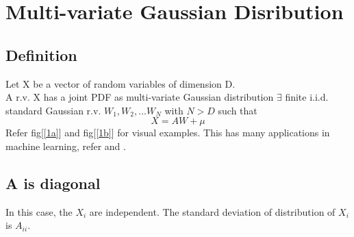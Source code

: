 \documentclass{article}
\begin{document}
\section{Multi-variate Gaussian Disribution}
\subsection{Definition}
Let X be a vector of random variables of dimension D.\\
A r.v. X has a joint PDF as multi-variate Gaussian distribution $\exists$ finite i.i.d. standard Gaussian r.v. $W_1,W_2,...W_N$ with $N > D$ such that
\[X = AW + \mu\]
\clearpage
Refer fig[\ref{1a}] and fig[\ref{1b}] for visual examples. This has many applications in machine learning, refer \cite{3} and \cite{2}.
\subsection{A is diagonal}
In this case, the $X_i$ are independent. The standard deviation of distribution of $X_i$ is $A_{ii}$.
\end{document}
